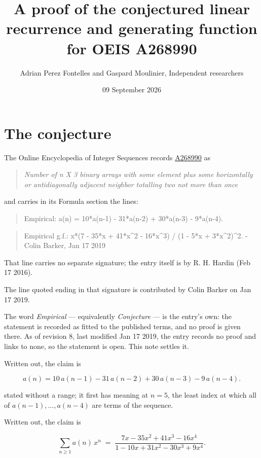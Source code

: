\documentclass[11pt]{article}
\title{A proof of the conjectured linear recurrence and generating function for OEIS A268990}
\author{Adrian Perez Fontelles and Gaspard Moulinier, Independent researchers}
\date{09 September 2026}
\theoremstyle{definition}
\begin{document}
\maketitle
\section{The conjecture}

The Online Encyclopedia of Integer Sequences records \href{https://oeis.org/A268990}{A268990} as

\begin{quote}\itshape Number of n X 3 binary arrays with some element plus some horizontally or antidiagonally adjacent neighbor totalling two not more than once\end{quote}

and carries in its Formula section the lines:

\begin{quote}\ttfamily Empirical: a(n) = 10*a(n-1) - 31*a(n-2) + 30*a(n-3) - 9*a(n-4).\end{quote}

\begin{quote}\ttfamily Empirical g.f.: x*(7 - 35*x + 41*x\textasciicircum{}2 - 16*x\textasciicircum{}3) / (1 - 5*x + 3*x\textasciicircum{}2)\textasciicircum{}2. - Colin Barker, Jan 17 2019\end{quote}

That line carries no separate signature; the entry itself is by R. H. Hardin (Feb 17 2016).

The line quoted ending in that signature is contributed by Colin Barker on Jan 17 2019.

The word {\itshape Empirical} --- equivalently {\itshape Conjecture} --- is the entry's own: the statement is recorded as fitted to the published terms, and no proof is given there. As of revision 8, last modified Jan 17 2019, the entry records no proof and links to none, so the statement is open. This note settles it.

Written out, the claim is

\[a(n) = 10\,a(n-1) - 31\,a(n-2) + 30\,a(n-3) - 9\,a(n-4).\]

stated without a range; it first has meaning at $n = 5$, the least index at which all of $a(n-1),\dots,a(n-4)$ are terms of the sequence.

Written out, the claim is

\[\sum_{n \ge 1} a(n)\,x^n \;=\; \frac{7x - 35x^{2} + 41x^{3} - 16x^{4}}{1 - 10x + 31x^{2} - 30x^{3} + 9x^{4}}.\]
\end{document}
